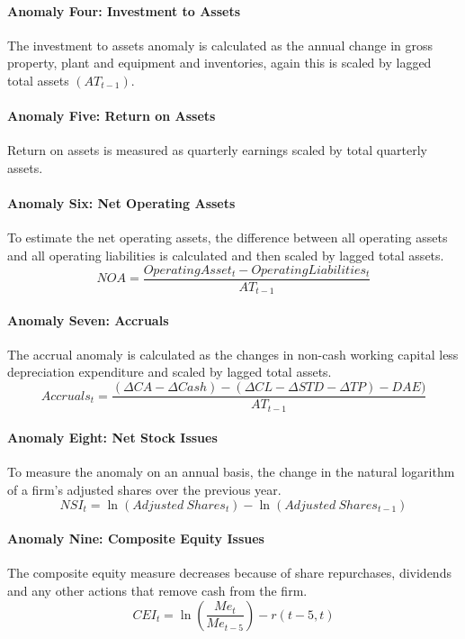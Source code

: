 \documentclass[12pt, a4paper, oneside]{article}
\begin{document}
\paragraph*{Anomaly Four: Investment to Assets}
The investment to assets anomaly is calculated as the annual change in gross property, plant and equipment and inventories, again this is scaled by lagged total assets \((AT_{t-1})\). 

\paragraph*{Anomaly Five: Return on Assets}
Return on assets is measured as quarterly earnings scaled by total quarterly assets. 

\paragraph*{Anomaly Six: Net Operating Assets}
To estimate the net operating assets, the difference between all operating assets and all operating liabilities is calculated and then scaled by lagged total assets.
\[
NOA= \frac{Operating Asset_t-Operating Liabilities_t}{AT_{t-1}}\]

\paragraph*{Anomaly Seven: Accruals}
The accrual anomaly is calculated as the changes in non-cash working capital less depreciation expenditure and scaled by lagged total assets.
\[
Accruals_t = \frac{(\Delta CA - \Delta Cash) - (\Delta CL -\Delta STD -\Delta TP)-DAE)}{AT_{t-1}}
\]

\paragraph*{Anomaly Eight: Net Stock Issues}
To measure the anomaly on an annual basis, the change in the natural logarithm of a firm’s adjusted shares over the previous year. 
\[
NSI_t = \ln (Adjusted \ Shares_t ) - \ln ( Adjusted \ Shares_{t-1})
\]

\paragraph*{Anomaly Nine: Composite Equity Issues}
The composite equity measure decreases because of share repurchases, dividends and any other actions that remove cash from the firm. 
\[
CEI_t = \ln (\frac{Me_t}{Me_{t-5}})  - r(t - 5,t)
\]
\end{document}
